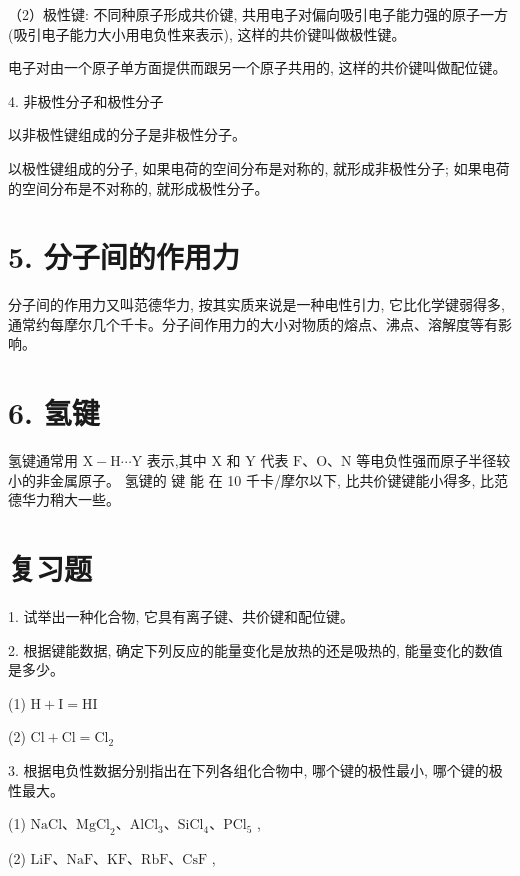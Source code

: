 \documentclass[10pt]{article}
\begin{document}
（2）极性键: 不同种原子形成共价键, 共用电子对偏向吸引电子能力强的原子一方(吸引电子能力大小用电负性来表示), 这样的共价键叫做极性键。

电子对由一个原子单方面提供而跟另一个原子共用的, 这样的共价键叫做配位键。

4. 非极性分子和极性分子

以非极性键组成的分子是非极性分子。

以极性键组成的分子, 如果电荷的空间分布是对称的, 就形成非极性分子; 如果电荷的空间分布是不对称的, 就形成极性分子。

\section*{5. 分子间的作用力}

分子间的作用力又叫范德华力, 按其实质来说是一种电性引力, 它比化学键弱得多, 通常约每摩尔几个千卡。分子间作用力的大小对物质的熔点、沸点、溶解度等有影响。

\section*{6. 氢键}

氢键通常用 \(\mathrm{X} - \mathrm{H}\cdots \mathrm{Y}\) 表示,其中 \(\mathrm{X}\) 和 \(\mathrm{Y}\) 代表 \(\mathrm{F}\text{、}\mathrm{O}\text{、}\mathrm{N}\) 等电负性强而原子半径较小的非金属原子。 氢键的 键 能 在 10 千卡/摩尔以下, 比共价键键能小得多, 比范德华力稍大一些。

\section*{复习题}

1. 试举出一种化合物, 它具有离子键、共价键和配位键。

2. 根据键能数据, 确定下列反应的能量变化是放热的还是吸热的, 能量变化的数值是多少。

(1) \(\mathrm{H} + \mathrm{I} = \mathrm{{HI}}\)

(2) \(\mathrm{{Cl}} + \mathrm{{Cl}} = {\mathrm{{Cl}}}_{2}\)

3. 根据电负性数据分别指出在下列各组化合物中, 哪个键的极性最小, 哪个键的极性最大。

(1) \(\mathrm{{NaCl}}\text{、}{\mathrm{{MgCl}}}_{2}\text{、}{\mathrm{{AlCl}}}_{3}\text{、}{\mathrm{{SiCl}}}_{4}\text{、}{\mathrm{{PCl}}}_{5}\) ,

(2) \(\mathrm{{LiF}}\text{、}\mathrm{{NaF}}\text{、}\mathrm{{KF}}\text{、}\mathrm{{RbF}}\text{、}\mathrm{{CsF}}\) ,
\end{document}
